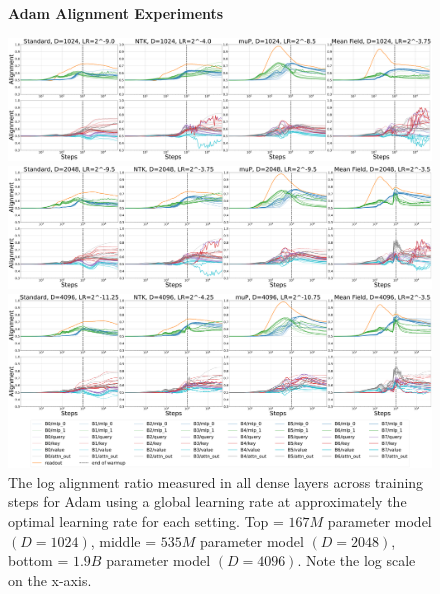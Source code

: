 \documentclass{article}
\theoremstyle{plain}
\theoremstyle{definition}
\theoremstyle{remark}
\begin{document}
\begin{figure}[ht]
    \begin{center}
        \textbf{Adam Alignment Experiments}\\
        \figvspace
        
        \includegraphics[width=\linewidth, trim={0, 0, 0, 0},clip]{icml2024/figures/alignment/appendix/adamw_1024.pdf}
       
        \figvspace
        \figvspace
       
        \includegraphics[width=\linewidth, trim={0, 0, 0, 0},clip]{icml2024/figures/alignment/appendix/adamw_2048.pdf}
       
        \figvspace
        \figvspace
       
        \includegraphics[width=\linewidth, trim={0, 0, 0, 0},clip]{icml2024/figures/alignment/appendix/adamw_4096_legend.pdf}
        \caption{The log alignment ratio measured in all dense layers across training steps for Adam using a global learning rate at approximately the optimal learning rate for each setting. Top = $167M$ parameter model $(D=1024)$, middle = $535M$ parameter model $(D=2048)$, bottom = $1.9B$ parameter model $(D=4096)$. Note the log scale on the x-axis.}
        \label{fig:appendix_alignment_adam}
    \end{center}
\end{figure}
\newpage
\end{document}
